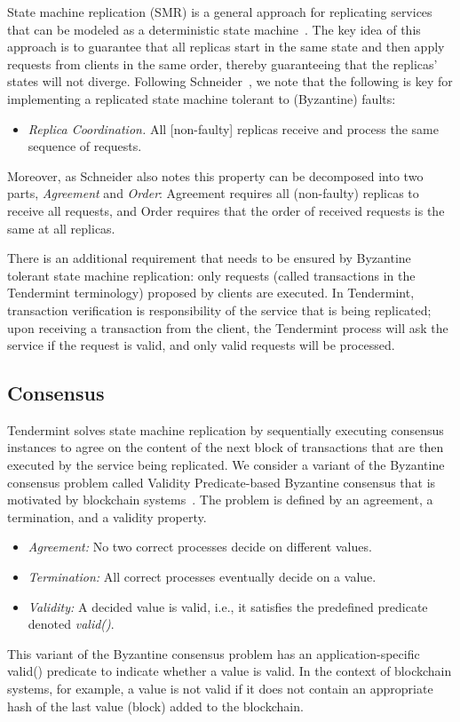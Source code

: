State machine replication (SMR) is a general approach for replicating
services that can be modeled as a deterministic state
machine~\cite{Lam78:cacm,Sch90:survey}.
The key idea of this approach is to guarantee that all replicas start
in the same state and then apply requests from clients in the
same order, thereby guaranteeing that the replicas' states will
not diverge.
Following Schneider~\cite{Sch90:survey}, we note that the following is key for
implementing a replicated state machine tolerant to (Byzantine) faults:

\begin{itemize}
	\item \emph{Replica Coordination.} All [non-faulty] replicas receive
	and process the same sequence of requests.
\end{itemize}

Moreover, as Schneider also notes this property can be decomposed into
two parts, \emph{Agreement} and \emph{Order}: Agreement
requires all (non-faulty) replicas to receive all
requests, and Order requires that the order of received requests
is the same at all replicas.

There is an additional requirement that needs to be ensured by Byzantine tolerant state machine replication:
only requests (called transactions in the Tendermint terminology) proposed by clients are executed. In Tendermint, transaction verification is responsibility of the service that is 
being replicated; upon receiving a transaction from the client, the Tendermint process will ask the service if the request is valid, and only valid 
requests will be processed. 

 \subsection{Consensus}
 \label{sec:consensus}

 \newcommand{\propose}{\mathsf{propose}}
 \newcommand{\decide}{\mathsf{decide}}

Tendermint solves state machine replication by sequentially executing consensus instances to agree on the content of the next block of transactions that are then executed by the service being replicated. We consider a variant of the Byzantine consensus problem called Validity Predicate-based Byzantine consensus that is motivated by blockchain
systems~\cite{GLR17:red-belly-bc}. The problem is defined by an agreement, a termination, and a validity
property.

 \begin{itemize}
 \item \emph{Agreement:} No two correct processes decide on different values.
 \item \emph{Termination:} All correct processes eventually decide on a value.
 \item \emph{Validity:} A decided value is valid, i.e., it satisfies the predefined predicate denoted \emph{valid()}.
 \end{itemize}

This variant of the Byzantine consensus problem has an application-specific valid() predicate to indicate whether a value is valid. In the context of blockchain systems, for example, a value is not valid if it does not contain an appropriate hash of the last value (block) added to the blockchain.
